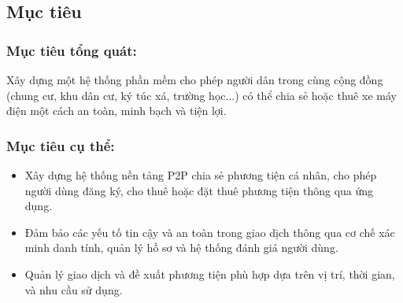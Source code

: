 \subsection{Mục tiêu}
\subsubsection*{Mục tiêu tổng quát:}
Xây dựng một hệ thống phần mềm cho phép người dân trong cùng cộng đồng (chung cư, khu dân cư, ký túc xá, trường học...) có thể chia sẻ hoặc thuê xe máy điện một cách an toàn, minh bạch và tiện lợi.

\subsubsection*{Mục tiêu cụ thể:}
\begin{itemize}
    \item Xây dựng hệ thống nền tảng P2P chia sẻ phương tiện cá nhân, cho phép người dùng đăng ký, cho thuê hoặc đặt thuê phương tiện thông qua ứng dụng. 
    \item Đảm bảo các yếu tố tin cậy và an toàn trong giao dịch thông qua cơ chế xác minh danh tính, quản lý hồ sơ và hệ thống đánh giá người dùng.
    \item Quản lý giao dịch và đề xuất phương tiện phù hợp dựa trên vị trí, thời gian, và nhu cầu sử dụng.
\end{itemize}



